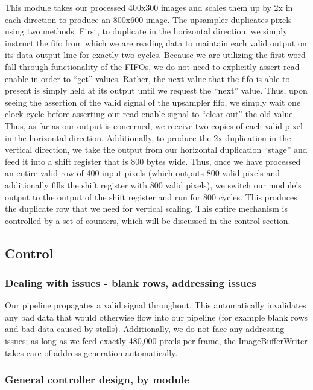 This module takes our processed 400x300 images and scales them up by 2x in each
direction to produce an 800x600 image. The upsampler duplicates pixels using 
two methods. First, to duplicate in the horizontal direction, we simply instruct
the fifo from which we are reading data to maintain each valid output on its
data output line for exactly two cycles. Because we are utilizing the 
first-word-fall-through functionality of the FIFOs, we do not need to explicitly 
assert read enable in order to ``get'' values. Rather, the next value that the
fifo is able to present is simply held at its output until we request the ``next'' value.
Thus, upon seeing the assertion of the valid signal of the upsampler fifo, we simply
wait one clock cycle before asserting our read enable signal to ``clear out'' the old
value. Thus, as far as our output is concerned, we receive two copies of each valid
pixel in the horizontal direction. Additionally, to produce the 2x duplication
in the vertical direction, we take the output from our horizontal duplication ``stage''
and feed it into a shift register that is 800 bytes wide. Thus, once we have
processed an entire valid row of 400 input pixels (which outputs 800 valid pixels and 
additionally fills the shift register with 800 valid pixels), we switch our module's 
output to the output of the shift register and run for 800 cycles. This produces
the duplicate row that we need for vertical scaling. This entire mechanism is
controlled by a set of counters, which will be discussed in the control section.

\subsection{Control}

\subsubsection{Dealing with issues - blank rows, addressing issues}

Our pipeline propagates a valid signal throughout. This automatically invalidates
any bad data that would otherwise flow into our pipeline (for example blank rows
and bad data caused by stalls). Additionally, we do not face any addressing issues;
as long as we feed exactly 480,000 pixels per frame, the ImageBufferWriter takes
care of address generation automatically.

\subsubsection{General controller design, by module}


